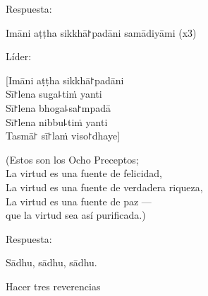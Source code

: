 \begin{instruction}
	Respuesta:
\end{instruction}

Imāni aṭṭha sikkhā꜓padāni samādiyāmi (x3)
\begin{instruction}
  Líder:
\end{instruction}

[Imāni aṭṭha sikkhā꜓padāni\\
Sī꜓lena suga꜕tiṁ yanti\\
Sī꜓lena bhoga꜕sa꜓mpadā\\
Sī꜓lena nibbu꜕tiṁ yanti\\
Tasmā꜓ sī꜓laṁ viso꜓dhaye]


\begin{english}
 (Estos son los Ocho Preceptos;\\
 La virtud es una fuente de felicidad,\\
 La virtud es una fuente de verdadera riqueza,\\
 La virtud es una fuente de paz ---\\
 que la virtud sea así purificada.)
\end{english}

\begin{instruction}
  Respuesta:
\end{instruction}

Sādhu, sādhu, sādhu.

\begin{instruction}
  Hacer tres reverencias
\end{instruction}

